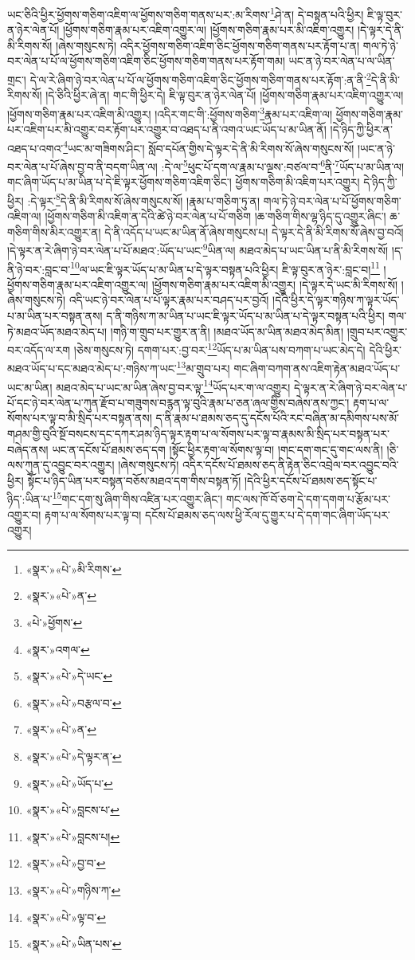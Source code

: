 ཡང་ཅིའི་ཕྱིར་ཕྱོགས་གཅིག་འཇིག་ལ་ཕྱོགས་གཅིག་གནས་པར་:མ་རིགས་\footnote{«སྣར་»«པེ་»མི་རིགས་}ཤེ་ན། དེ་བསྟན་པའི་ཕྱིར། ཇི་ལྟ་བུར་ན་ཉེར་ལེན་པོ། །ཕྱོགས་གཅིག་རྣམ་པར་འཇིག་འགྱུར་ལ། །ཕྱོགས་གཅིག་རྣམ་པར་མི་འཇིག་འགྱུར། །དེ་ལྟར་དེ་ནི་མི་རིགས་སོ། །ཞེས་གསུངས་ཏེ། འདིར་ཕྱོགས་གཅིག་འཇིག་ཅིང་ཕྱོགས་གཅིག་གནས་པར་རྟོག་པ་ན། གལ་ཏེ་ཉེ་བར་ལེན་པ་པོ་ལ་ཕྱོགས་གཅིག་འཇིག་ཅིང་ཕྱོགས་གཅིག་གནས་པར་རྟོག་གམ། ཡང་ན་ཉེ་བར་ལེན་པ་ལ་ཡིན་གྲང་། དེ་ལ་རེ་ཞིག་ཉེ་བར་ལེན་པ་པོ་ལ་ཕྱོགས་གཅིག་འཇིག་ཅིང་ཕྱོགས་གཅིག་གནས་པར་རྟོག་:ན་ནི་\footnote{«སྣར་»«པེ་»ན་}དེ་ནི་མི་རིགས་སོ། །དེ་ཅིའི་ཕྱིར་ཞེ་ན། གང་གི་ཕྱིར་དེ། ཇི་ལྟ་བུར་ན་ཉེར་ལེན་པོ། །ཕྱོགས་གཅིག་རྣམ་པར་འཇིག་འགྱུར་ལ། །ཕྱོགས་གཅིག་རྣམ་པར་འཇིག་མི་འགྱུར། །འདིར་གང་གི་:ཕྱོགས་གཅིག་\footnote{«པེ་»ཕྱོགས་}རྣམ་པར་འཇིག་ལ། ཕྱོགས་གཅིག་རྣམ་པར་འཇིག་པར་མི་འགྱུར་བར་རྟོག་པར་འགྱུར་བ་འཐད་པ་ནི་འགའ་ཡང་ཡོད་པ་མ་ཡིན་ནོ། །དེ་ཉིད་ཀྱི་ཕྱིར་ན་འཐད་པ་འགའ་\footnote{«སྣར་»འགལ་}ཡང་མ་གཟིགས་ཤིང་། སློབ་དཔོན་གྱིས་དེ་ལྟར་དེ་ནི་མི་རིགས་སོ་ཞེས་གསུངས་སོ། །ཡང་ན་ཉེ་བར་ལེན་པ་པོ་ཞེས་བྱ་བ་ནི་བདག་ཡིན་ལ། :དེ་ལ་\footnote{«སྣར་»«པེ་»དེ་ཡང་}ཕུང་པོ་དག་ལ་རྣམ་པ་ལྔས་:བཙལ་བ་\footnote{«སྣར་»«པེ་»བརྩལ་བ་}ནི་\footnote{«སྣར་»«པེ་»ན་}ཡོད་པ་མ་ཡིན་ལ། གང་ཞིག་ཡོད་པ་མ་ཡིན་པ་དེ་ཇི་ལྟར་ཕྱོགས་གཅིག་འཇིག་ཅིང་། ཕྱོགས་གཅིག་མི་འཇིག་པར་འགྱུར། དེ་ཉིད་ཀྱི་ཕྱིར། :དེ་ལྟར་\footnote{«སྣར་»«པེ་»དེ་ལྟར་ན་}དེ་ནི་མི་རིགས་སོ་ཞེས་གསུངས་སོ། །རྣམ་པ་གཅིག་ཏུ་ན། གལ་ཏེ་ཉེ་བར་ལེན་པ་པོ་ཕྱོགས་གཅིག་འཇིག་ལ། །ཕྱོགས་གཅིག་མི་འཇིག་ན་དེའི་ཚེ་ཉེ་བར་ལེན་པ་པོ་གཅིག །ཆ་གཅིག་གིས་ལྷ་ཉིད་དུ་འགྱུར་ཞིང་། ཆ་གཅིག་གིས་མིར་འགྱུར་ན། དེ་ནི་འདོད་པ་ཡང་མ་ཡིན་ནོ་ཞེས་གསུངས་པ། དེ་ལྟར་དེ་ནི་མི་རིགས་སོ་ཞེས་བྱ་བའོ། །དེ་ལྟར་ན་རེ་ཞིག་ཉེ་བར་ལེན་པ་པོ་མཐའ་:ཡོད་པ་ཡང་\footnote{«སྣར་»«པེ་»ཡོད་པ་}ཡིན་ལ། མཐའ་མེད་པ་ཡང་ཡིན་པ་ནི་མི་རིགས་སོ། །ད་ནི་ཉེ་བར་:བླང་བ་\footnote{«སྣར་»«པེ་»བླངས་པ་}ལ་ཡང་ཇི་ལྟར་ཡོད་པ་མ་ཡིན་པ་དེ་ལྟར་བསྟན་པའི་ཕྱིར། ཇི་ལྟ་བུར་ན་ཉེར་:བླང་བ།\footnote{«སྣར་»«པེ་»བླངས་པ།} །ཕྱོགས་གཅིག་རྣམ་པར་འཇིག་འགྱུར་ལ། །ཕྱོགས་གཅིག་རྣམ་པར་འཇིག་མི་འགྱུར། །དེ་ལྟར་དེ་ཡང་མི་རིགས་སོ། །ཞེས་གསུངས་ཏེ། འདི་ཡང་ཉེ་བར་ལེན་པ་པོ་ལྟར་རྣམ་པར་བཤད་པར་བྱའོ། །དེའི་ཕྱིར་དེ་ལྟར་གཉིས་ཀ་ལྟར་ཡོད་པ་མ་ཡིན་པར་བསྟན་ནས། ད་ནི་གཉིས་ཀ་མ་ཡིན་པ་ཡང་ཇི་ལྟར་ཡོད་པ་མ་ཡིན་པ་དེ་ལྟར་བསྟན་པའི་ཕྱིར། གལ་ཏེ་མཐའ་ཡོད་མཐའ་མེད་པ། །གཉི་ག་གྲུབ་པར་གྱུར་ན་ནི། །མཐའ་ཡོད་མ་ཡིན་མཐའ་མེད་མིན། །གྲུབ་པར་འགྱུར་བར་འདོད་ལ་རག །ཅེས་གསུངས་ཏེ། དགག་པར་:བྱ་བར་\footnote{«སྣར་»«པེ་»བྱ་བ་}ཡོད་པ་མ་ཡིན་པས་བཀག་པ་ཡང་མེད་དེ། དེའི་ཕྱིར་མཐའ་ཡོད་པ་དང་མཐའ་མེད་པ་:གཉིས་ཀ་ཡང་\footnote{«སྣར་»«པེ་»གཉིས་ཀ་}མ་གྲུབ་པར། གང་ཞིག་བཀག་ནས་འཇིག་རྟེན་མཐའ་ཡོད་པ་ཡང་མ་ཡིན། མཐའ་མེད་པ་ཡང་མ་ཡིན་ཞེས་བྱ་བར་ལྟ་\footnote{«སྣར་»«པེ་»ལྟ་བ་}ཡོད་པར་ག་ལ་འགྱུར། དེ་ལྟར་ན་རེ་ཞིག་ཉེ་བར་ལེན་པ་པོ་དང་ཉེ་བར་ལེན་པ་ཀུན་རྫོབ་པ་གཟུགས་བརྙན་ལྟ་བུའི་རྣམ་པ་ཅན་ཞལ་གྱིས་བཞེས་ནས་ཀྱང་། རྟག་པ་ལ་སོགས་པར་ལྟ་བ་མི་སྲིད་པར་བསྟན་ནས། ད་ནི་རྣམ་པ་ཐམས་ཅད་དུ་དངོས་པོའི་རང་བཞིན་མ་དམིགས་པས་མོ་གཤམ་གྱི་བུའི་སྔོ་བསངས་དང་དཀར་ཤམ་ཉིད་ལྟར་རྟག་པ་ལ་སོགས་པར་ལྟ་བ་རྣམས་མི་སྲིད་པར་བསྟན་པར་བཞེད་ནས། ཡང་ན་དངོས་པོ་ཐམས་ཅད་དག །སྟོང་ཕྱིར་རྟག་ལ་སོགས་ལྟ་བ། །གང་དག་གང་དུ་གང་ལས་ནི། །ཅི་ལས་ཀུན་དུ་འབྱུང་བར་འགྱུར། །ཞེས་གསུངས་ཏེ། འདིར་དངོས་པོ་ཐམས་ཅད་ནི་རྟེན་ཅིང་འབྲེལ་བར་འབྱུང་བའི་ཕྱིར། སྟོང་པ་ཉིད་ཡིན་པར་བསྟན་བཅོས་མཐའ་དག་གིས་བསྟན་ཏོ། །དེའི་ཕྱིར་དངོས་པོ་ཐམས་ཅད་སྟོང་པ་ཉིད་:ཡིན་པ་\footnote{«སྣར་»«པེ་»ཡིན་པས་}གང་དག་སུ་ཞིག་གིས་འཛིན་པར་འགྱུར་ཞིང་། གང་ལས་ཁོ་བོ་ཅག་དེ་དག་དགག་པ་རྩོམ་པར་འགྱུར་བ། རྟག་པ་ལ་སོགས་པར་ལྟ་བ། དངོས་པོ་ཐམས་ཅད་ལས་ཕྱི་རོལ་དུ་གྱུར་པ་དེ་དག་གང་ཞིག་ཡོད་པར་འགྱུར། 